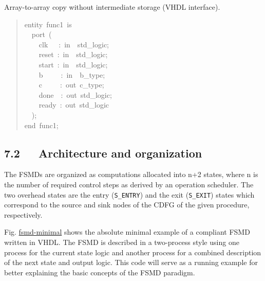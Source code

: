 \documentclass[a4paper]{article}
\begin{document}
\label{fsmd-arrif-vhdl}
Array-to-array copy without intermediate storage (VHDL interface).
%
\begin{quote}{\ttfamily \raggedright \noindent
entity~func1~is\\
~~port~(\\
~~~~clk~~~:~in~~std\_logic;\\
~~~~reset~:~in~~std\_logic;\\
~~~~start~:~in~~std\_logic;\\
~~~~b~~~~~:~in~~b\_type;\\
~~~~c~~~~~:~out~c\_type;\\
~~~~done~~:~out~std\_logic;\\
~~~~ready~:~out~std\_logic\\
~~);\\
end~func1;
}
\end{quote}


\subsection{7.2~~~Architecture and organization%
  \label{architecture-and-organization}%
}

The FSMDs are organized as computations allocated into n+2 states, where n is
the number of required control steps as derived by an operation scheduler. The
two overhead states are the entry (\texttt{S\_ENTRY}) and the exit (\texttt{S\_EXIT}) states
which correspond to the source and sink nodes of the CDFG of the given
procedure, respectively.

Fig. \hyperref[fsmd-minimal]{fsmd-minimal} shows the absolute minimal example of a compliant FSMD
written in VHDL. The FSMD is described in a two-process style using one process
for the current state logic and another process for a combined description of
the next state and output logic. This code will serve as a running example for
better explaining the basic concepts of the FSMD paradigm.
\end{document}
